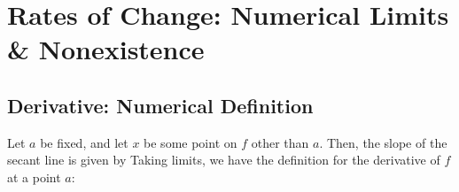 \documentclass[notes]{subfiles}
\begin{document}
	\fancyhead[LO,RE]{\bfseries  \small \currentname}
	\fancyfoot[C]{{}}
	\fancyfoot[RO,LE]{\large \thepage}	%


\section*{Rates of Change: Numerical Limits \& Nonexistence}\label{cs24}
	\subsection*{Derivative: Numerical Definition}
		Let $a$ be fixed, and let $x$ be some point on $f$ other than $a$.  Then, the slope of the secant line is given by
		Taking limits, we have the definition for the derivative of $f$ at a point $a$:
			
\end{document}
